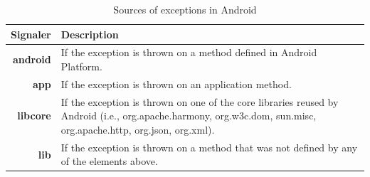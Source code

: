 \documentclass[conference]{IEEEtran}
\begin{document}

\begin{table}
  \centering
  \begin{tabular}{rp{29em}}
    \hline
    \bfseries{Signaler} & \bfseries{Description} \\
    \hline
    \bfseries{android} & If the exception is thrown on a method defined in Android Platform.\\
    \bfseries{app}     & If the exception is thrown on an application method.\\
    \bfseries{libcore} & If the exception is thrown on one of the core libraries reused by Android (i.e., org.apache.harmony, org.w3c.dom, sun.misc, org.apache.http, org.json, org.xml). \\
    \bfseries{lib}     & If the exception is thrown on a method that was not defined by any of the elements above.\\
    \hline
  \end{tabular}
  \caption{Sources of exceptions in Android}
  \label{tab:signalers}
\end{table}






\end{document}
